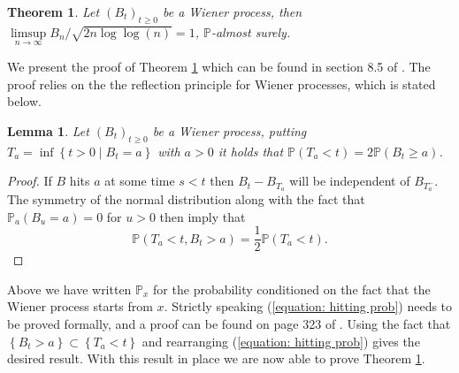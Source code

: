 \documentclass{article}
\newtheorem{theorem}{Theorem}[section]
\newtheorem{lemma}{Lemma}[section]
\begin{document}
\begin{theorem}
Let $\left (B_t \right )_{t \geq 0}$ be a Wiener process, then $\limsup\limits_{n \rightarrow \infty} B_n / \sqrt{2 n \log \log (n)} = 1 $, $\mathbb{P}$-almost surely. 
\label{theorem: BM LIL}
\end{theorem}
We present the proof of Theorem \ref{theorem: BM LIL} which can be found in section 8.5 of \cite{durrett2019probability}. The proof relies on the the reflection principle for Wiener processes, which is stated below. 
\begin{lemma}
Let $\left (B_t \right )_{t \geq 0}$ be a Wiener process, putting $T_a = \inf \left \{ t > 0 \mid B_t = a \right \}$ with $a > 0$ it holds that $\mathbb{P} \left ( T_a < t \right ) = 2 \mathbb{P} \left ( B_t \geq a \right )$. 
\end{lemma}
\begin{proof}
If $B$ hits $a$ at some time $s < t$ then $B_t - B_{T_a}$ will be independent of $B_{T_a^-}$. The symmetry of the normal distribution along with the fact that $\mathbb{P}_a \left ( B_u = a \right ) = 0 $ for $u > 0$ then imply that
\begin{equation}
\mathbb{P} \left ( T_a < t, B_t > a \right ) = \frac{1}{2} \mathbb{P} \left ( T_a < t \right ). 
\label{equation: hitting prob}
\end{equation}
\label{lemma: reflection principle}
\end{proof} 

Above we have written $\mathbb{P}_x$ for the probability conditioned on the fact that the Wiener process starts from $x$. Strictly speaking (\ref{equation: hitting prob}) needs to be proved formally, and a proof can be found on page 323 of \cite{durrett2019probability}. Using the fact that $\left \{ B_t > a \right \} \subset \left \{ T_a < t \right \} $ and rearranging (\ref{equation: hitting prob}) gives the desired result. With this result in place we are now able to prove Theorem \ref{theorem: BM LIL}.
\end{document}

